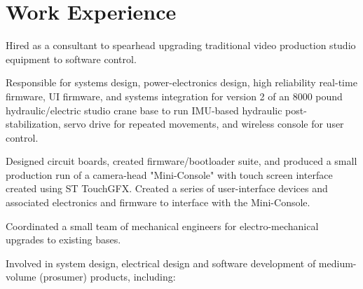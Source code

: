 \documentclass[letterpaper]{deedy-resume} %
\begin{document}
\begin{minipage}[t]{0.66\textwidth} %


\sectionspace %

\section{Work Experience}

\vspace{\topsep} %
\begin{tightitemize}
\item 
Hired as a consultant to spearhead upgrading traditional video production studio equipment to software control.

\item
Responsible for systems design, power-electronics design, high reliability real-time firmware, UI firmware, and systems integration for version 2 of an 8000 pound hydraulic/electric studio crane base to run IMU-based hydraulic post-stabilization, servo drive for repeated movements, and wireless console for user control.

\item 
Designed circuit boards, created firmware/bootloader suite, and produced a small production run of a camera-head "Mini-Console" with touch screen interface created using ST TouchGFX.  Created a series of user-interface devices and associated electronics and firmware to interface with the Mini-Console.

\item Coordinated a small team of mechanical engineers for electro-mechanical upgrades to existing bases.

\end{tightitemize}

\begin{tightitemize}
\item 
Involved in system design, electrical design and software development of medium-volume (prosumer) products, including:


\end{tightitemize}
\end{minipage}
\end{document}
